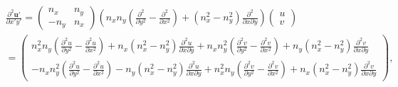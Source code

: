 \documentclass[review]{elsarticle}
\begin{document}
	\begin{equation}\label{du'2dx'dy'}
	\begin{gathered}
		\frac{\partial^2{\bm{u}'}}{\partial{x'y'}} 
			= \left(\begin{array}{cc}
				n_x & n_y \\
				-n_y & n_x
			    \end{array} \right) 
		     \left(n_xn_y\left(\frac{\partial^2}{\partial y^2}-\frac{\partial^2}{\partial x^2}\right)
			     +\left(n_x^2-n_y^2\right)\frac{\partial^2}{\partial x\partial y} \right) 
		     \left(\begin{array}{c} u \\ v \end{array} \right)\\
		   = \left(\begin{array}{c}
				 n_x^2n_y\left(\frac{\partial^2 u}{\partial y^2}-\frac{\partial^2 u}{\partial x^2}\right)
			     +n_x\left(n_x^2-n_y^2\right)\frac{\partial^2 u}{\partial x\partial y}
			     +n_xn_y^2\left(\frac{\partial^2 v}{\partial y^2}-\frac{\partial^2 v}{\partial x^2}\right)
			     +n_y\left(n_x^2-n_y^2\right)\frac{\partial^2 v}{\partial x\partial y}\\
			     -n_xn_y^2\left(\frac{\partial^2 u}{\partial y^2}-\frac{\partial^2 u}{\partial x^2}\right)
			     -n_y\left(n_x^2-n_y^2\right)\frac{\partial^2 u}{\partial x\partial y}
			     +n_x^2n_y\left(\frac{\partial^2 v}{\partial y^2}-\frac{\partial^2 v}{\partial x^2}\right)
			     +n_x\left(n_x^2-n_y^2\right)\frac{\partial^2 v}{\partial x\partial y}
	   	     \end{array}\right),
	\end{gathered}
\end{equation}
\end{document}
